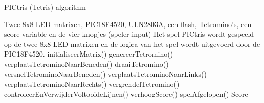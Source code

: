 \begin{algorithm}
    \caption{PICtris (Tetris) algorithm}
    \label{alg:tetris}
    \begin{algorithmic}[1]
    \REQUIRE Twee 8x8 LED matrixen, PIC18F4520, ULN2803A, een flash, Tetromino's, een score variable en de vier knopjes (speler input)
    \ENSURE Het spel PICtris wordt gespeeld op de twee 8x8 LED matrixen en de logica van het spel wordt uitgevoerd door de PIC18F4520.
    \STATE initialiseerMatrix()
        \STATE genereerTetromino()
        \STATE verplaatsTetrominoNaarBeneden()
            \STATE draaiTetromino()
            \STATE versnelTetrominoNaarBeneden()
                \STATE verplaatsTetrominoNaarLinks()
            \ENDIF
                \STATE verplaatsTetrominoNaarRechts()
            \ENDIF
        \ENDIF
            \STATE vergrendelTetromino()
            \STATE controleerEnVerwijderVoltooideLijnen()
                \STATE verhoogScore()
            \ENDIF
        \ENDIF
            \STATE spelAfgelopen()
        \ENDIF
    \ENDWHILE
    \RETURN Score
    \end{algorithmic}
\end{algorithm}
\pagebreak